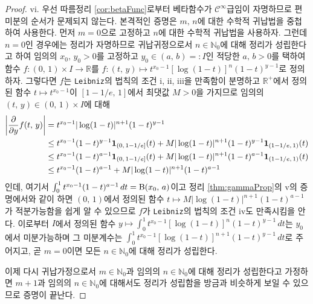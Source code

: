 \begin{proof}
    vi. 우선 따름정리 \ref{cor:betaFunc}로부터 베타함수가 $\mathcal{C}^\infty$급임이 자명하므로 편미분의 순서가 문제되지 않는다. 본격적인 증명은 $m,\,n$에 대한 수학적 귀납법을 중첩하여 사용한다. 먼저 $m=0$으로 고정하고 $n$에 대한 수학적 귀납법을 사용하자. 그런데 $n=0$인 경우에는 정리가 자명하므로 귀납귀정으로서 $n\in\mathbb{N}_0$에 대해 정리가 성립한다고 하여 임의의 $x_0,\,y_0>0$를 고정하고 $y_0\in(a,\,b)=:I$인 적당한 $a,\,b>0$를 택하여 함수 $f:(0,\,1)\times I\to\mathbb{R}$를 $f:(t,\,y)\mapsto t^{x_0-1}[\log(1-t)]^n(1-t)^{y-1}$로 정의하자. 그렇다면 $f$는 \texttt{Leibniz}의 법칙의 조건 i, ii, iii을 만족함이 분명하고 $\mathbb{R}^+$에서 정의된 함수 $t\mapsto t^{x_0-1}$이 $[1-1/e,\,1]$에서 최댓값 $M>0$을 가지므로 임의의 $(t,\,y)\in(0,\,1)\times I$에 대해
    \begin{align*}
        \bigg|\frac{\partial}{\partial y}f(t,\,y)\bigg|&=t^{x_0-1}|\log(1-t)|^{n+1}(1-t)^{y-1}\\
        &\leq t^{x_0-1}(1-t)^{y-1}\mathbf{1}_{(0,\,1-1/e]}(t)+M|\log(1-t)|^{n+1}(1-t)^{y-1}\mathbf{1}_{(1-1/e,\,1)}(t)\\
        &\leq t^{x_0-1}(1-t)^{a-1}\mathbf{1}_{(0,\,1-1/e]}(t)+M|\log(1-t)|^{n+1}(1-t)^{a-1}\mathbf{1}_{(1-1/e,\,1)}(t)\\
        &\leq t^{x_0-1}(1-t)^{a-1}+M|\log(1-t)|^{n+1}(1-t)^{a-1}
    \end{align*}
    인데, 여기서 $\int_0^1t^{x_0-1}(1-t)^{a-1}\,dt=\mathrm{B}(x_0,\,a)$이고 정리 \ref{thm:gammaProp}의 v의 증명에서와 같이 하면 $(0,\,1)$에서 정의된 함수 $t\mapsto M|\log(1-t)|^{n+1}(1-t)^{a-1}$가 적분가능함을 쉽게 알 수 있으므로 $f$가 \texttt{Leibniz}의 법칙의 조건 iv도 만족시킴을 안다. 이로부터 $I$에서 정의된 함수 $y\mapsto\int_0^1t^{x_0-1}[\log(1-t)]^n(1-t)^{y-1}\,dt$는 $y_0$에서 미분가능하며 그 미분계수는 $\int_0^1t^{x_0-1}[\log(1-t)]^{n+1}(1-t)^{y-1}\,dt$로 주어지고, 곧 $m=0$이면 모든 $n\in\mathbb{N}_0$에 대해 정리가 성립한다.

    이제 다시 귀납가정으로서 $m\in\mathbb{N}_0$과 임의의 $n\in\mathbb{N}_0$에 대해 정리가 성립한다고 가정하면 $m+1$과 임의의 $n\in\mathbb{N}_0$에 대해서도 정리가 성립함을 방금과 비슷하게 보일 수 있으므로 증명이 끝난다. 
\end{proof}

\begin{figure}[!ht]
    \centering
\end{figure}

